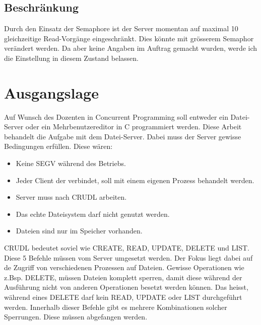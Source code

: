 \documentclass[12pt,a4paper,ngerman]{report}
\begin{document}
\section{Beschränkung}
Durch den Einsatz der Semaphore ist der Server momentan auf maximal 10 gleichzeitige Read-Vorgänge eingeschränkt. Dies könnte mit grösserem Semaphor verändert werden. Da aber keine Angaben im Auftrag gemacht wurden, werde ich die Einstellung in diesem Zustand belassen.
\chapter{Ausgangslage}
Auf Wunsch des Dozenten in Concurrent Programming soll entweder ein Datei-Server oder ein Mehrbenutzereditor in C programmiert werden. Diese Arbeit behandelt die Aufgabe mit dem Datei-Server. Dabei muss der Server gewisse Bedingungen erfüllen. Diese wären:
\begin{itemize}
	\item Keine SEGV während des Betriebs.
	\item Jeder Client der verbindet, soll mit einem eigenen Prozess behandelt werden.
	\item Server muss nach CRUDL arbeiten.
	\item Das echte Dateisystem darf nicht genutzt werden.
	\item Dateien sind nur im Speicher vorhanden.
\end{itemize}

CRUDL bedeutet soviel wie CREATE, READ, UPDATE, DELETE und LIST. Diese 5 Befehle müssen vom Server umgesetzt werden. Der Fokus liegt dabei auf de  Zugriff von verschiedenen Prozessen auf Dateien. Gewisse Operationen wie z.Bsp. DELETE, müssen Dateien komplett sperren, damit diese während der Ausführung nicht von anderen Operationen besetzt werden können. Das heisst, während eines DELETE darf kein READ, UPDATE oder LIST durchgeführt werden. Innerhalb dieser Befehle gibt es mehrere Kombinationen solcher Sperrungen. Diese müssen abgefangen werden.
\end{document}
